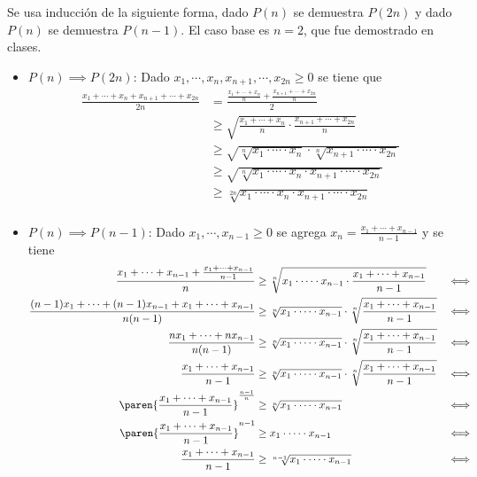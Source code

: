 \documentclass{ayudantia}
\begin{document}
\begin{ans}
    \begin{sol}
        Se usa inducción de la siguiente forma, dado \(P(n)\) se demuestra \(P(2n)\) y dado \(P(n)\) se demuestra \(P(n-1)\). El caso base es \(n=2\), que fue demostrado en clases.
        \begin{itemize}
            \item\(P(n)\implies P(2n)\): Dado \(x_1,\cdots,x_n,x_{n+1},\cdots,x_{2n}\geq0\) se tiene que
            \begin{align*}
                \frac{x_1+\cdots+x_n+x_{n+1}+\cdots+x_{2n}}{2n}&=\frac{\frac{x_1+\cdots+x_n}n+\frac{x_{n+1}+\cdots+x_{2n}}n}2\\
                &\geq\sqrt{\frac{x_1+\cdots+x_n}n\cdot\frac{x_{n+1}+\cdots+x_{2n}}n}\\
                &\geq\sqrt{\sqrt[n]{x_1\cdot\cdots\cdot x_n}\cdot\sqrt[n]{x_{n+1}\cdot\cdots\cdot x_{2n}}}\\
                &\geq\sqrt{\sqrt[n]{x_1\cdot\cdots\cdot x_n\cdot x_{n+1}\cdot\cdots\cdot x_{2n}}}\\
                &\geq\sqrt[2n]{x_1\cdot\cdots\cdot x_n\cdot x_{n+1}\cdot\cdots\cdot x_{2n}}\\
            \end{align*}
            \item \(P(n)\implies P(n-1)\): Dado \(x_1,\cdots,x_{n-1}\geq0\) se agrega \(x_n=\frac{x_1+\cdots+x_{n-1}}{n-1}\) y se tiene
            \begin{align*}
                \frac{x_1+\cdots+x_{n-1}+\frac{x_1+\cdots+x_{n-1}}{n-1}}n&\geq\sqrt[n]{x_1\cdot\cdots\cdot x_{n-1}\cdot\frac{x_1+\cdots+x_{n-1}}{n-1}}&\iff\\
                \frac{(n-1)x_1+\cdots+(n-1)x_{n-1}+x_1+\cdots+x_{n-1}}{n(n-1)}&\geq\sqrt[n]{x_1\cdot\cdots\cdot x_{n-1}}\cdot\sqrt[n]{\frac{x_1+\cdots+x_{n-1}}{n-1}}&\iff\\
                \frac{nx_1+\cdots+nx_{n-1}}{n(n-1)}&\geq\sqrt[n]{x_1\cdot\cdots\cdot x_{n-1}}\cdot\sqrt[n]{\frac{x_1+\cdots+x_{n-1}}{n-1}}&\iff\\
                \frac{x_1+\cdots+x_{n-1}}{n-1}&\geq\sqrt[n]{x_1\cdot\cdots\cdot x_{n-1}}\cdot\sqrt[n]{\frac{x_1+\cdots+x_{n-1}}{n-1}}&\iff\\
                \paren{\frac{x_1+\cdots+x_{n-1}}{n-1}}^{\frac{n-1}n}&\geq\sqrt[n]{x_1\cdot\cdots\cdot x_{n-1}}&\iff\\
                \paren{\frac{x_1+\cdots+x_{n-1}}{n-1}}^{n-1}&\geq x_1\cdot\cdots\cdot x_{n-1}&\iff\\
                \frac{x_1+\cdots+x_{n-1}}{n-1}&\geq \sqrt[n-1]{x_1\cdot\cdots\cdot x_{n-1}}&\iff\\
            \end{align*}
        \end{itemize}
    \end{sol}
\end{ans}
\end{document}
